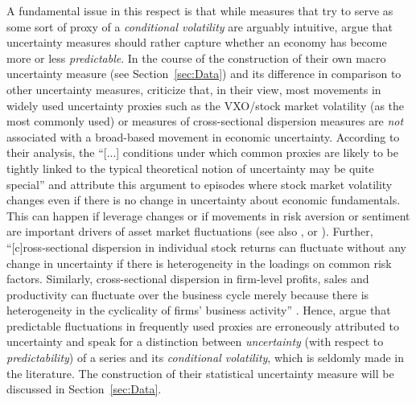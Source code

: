 \documentclass[a4paper,11pt,listof=nochaptergap,oneside,pointednumbers,bibtotoc,bigheadings,liststotoc,hidelinks]{scrbook}
\theoremstyle{mysatz}
\theoremstyle{mydefinition}
\theoremstyle{mytheorem}
\theoremstyle{mybemerkung}
\begin{document}
A fundamental issue in this respect is that while measures that try to serve as some sort of proxy of a \textit{conditional volatility} are arguably intuitive, \citet{juradoetal:15} argue that uncertainty measures should rather capture whether an economy has become more or less \textit{predictable}. In the course of the construction of their own macro uncertainty measure (see Section~\ref{sec:Data}) and its difference in comparison to other uncertainty measures, \citet{juradoetal:15} criticize that, in their view, most movements in widely used uncertainty proxies such as the VXO/stock market volatility (as the most commonly used) or measures of cross-sectional dispersion measures are \textit{not} associated with a broad-based movement in economic uncertainty. According to their analysis, the ``[...] conditions under which common proxies are likely to be tightly linked to the typical theoretical notion of uncertainty may be quite special'' \citep[p. 1178]{juradoetal:15} and attribute this argument to episodes where stock market volatility changes even if there is no change in uncertainty about economic fundamentals. This can happen if leverage changes or if movements in risk aversion or sentiment are important drivers of asset market fluctuations (see also \citet{bekaertetal:13}, \citet{moore:17} or \citet{IMF:17}). Further, ``[c]ross-sectional dispersion in individual stock returns can fluctuate without any change in uncertainty if there is heterogeneity in the loadings on common risk factors. Similarly, cross-sectional dispersion in firm-level profits, sales and productivity can fluctuate over the business cycle merely because there is heterogeneity in the cyclicality of firms' business activity'' \citep[p. 1178]{juradoetal:15}. Hence, \citet{juradoetal:15} argue that predictable fluctuations in frequently used proxies are erroneously attributed to uncertainty and speak for a distinction between \textit{uncertainty} (with respect to \textit{predictability}) of a series and its \textit{conditional volatility}, which is seldomly made in the literature. The construction of their statistical uncertainty measure will be discussed in Section~\ref{sec:Data}.\\
\end{document}
